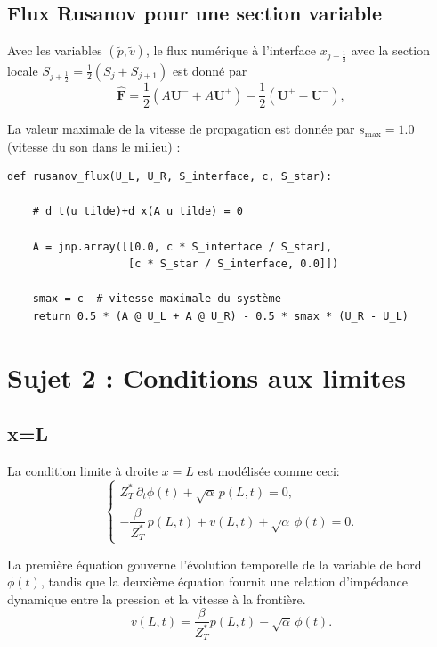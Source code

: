 \documentclass[12pt,a4paper]{article}
\begin{document}
\subsection{Flux Rusanov pour une section variable}

Avec les variables $(\tilde p, \tilde v)$, le flux numérique à l'interface
$x_{j+\frac12}$ avec la section locale $S_{j+\frac12}=\frac12(S_j+S_{j+1})$ est donné par
\begin{equation}
\widehat{\mathbf{F}} =
\frac{1}{2}(A\mathbf{U}^- + A\mathbf{U}^+)
- \frac{1}{2}(\mathbf{U}^+ - \mathbf{U}^-),
\end{equation}


La valeur maximale de la vitesse de propagation est donnée par $s_{\max} = 1.0$ (vitesse du son dans le milieu) :

\begin{verbatim}
def rusanov_flux(U_L, U_R, S_interface, c, S_star):

    # d_t(u_tilde)+d_x(A u_tilde) = 0

    A = jnp.array([[0.0, c * S_interface / S_star],
                   [c * S_star / S_interface, 0.0]])
    
    smax = c  # vitesse maximale du système
    return 0.5 * (A @ U_L + A @ U_R) - 0.5 * smax * (U_R - U_L)
\end{verbatim}

\section{Sujet 2 : Conditions aux limites}

\subsection{x=L}

La condition limite à droite $x=L$ est modélisée comme ceci:
\begin{equation}
\begin{cases}
Z^\ast_T\,\partial_t \phi(t)
+ \sqrt{\alpha}\, p(L,t) = 0,
\\[0.4em]
-\dfrac{\beta}{Z^\ast_T}\, p(L,t)
+ v(L,t)
+ \sqrt{\alpha}\,\phi(t) = 0.
\end{cases}
\label{eq:bc_ode_pde}
\end{equation}

La première équation gouverne l'évolution temporelle de la variable de bord $\phi(t)$, tandis que la deuxième
équation fournit une relation d'impédance dynamique entre la pression et la vitesse à la frontière.
\begin{equation}
v(L,t) = \frac{\beta}{Z^\ast_T} p(L,t) - \sqrt{\alpha}\,\phi(t).
\tag{BC}
\end{equation}
\end{document}
